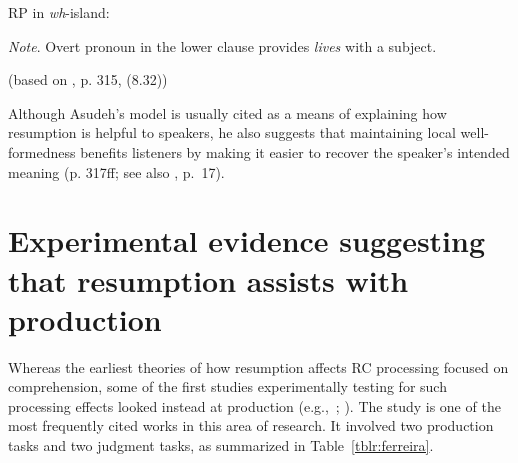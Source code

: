 \a RP in \textit{wh}-island:\par\nobreak
{}\par\nobreak
\textit{Note}. Overt pronoun in the lower clause provides \textit{lives} with a subject.\par\nobreak\vspace{5pt}
\hfill (based on \cite{asudeh2004}, p. 315, (8.32))\label{ex-asudeh-c}
\xe 

\noindent Although Asudeh's model is usually cited as a means of explaining how resumption is helpful to speakers, he also suggests that maintaining local well-formedness benefits listeners by making it easier to recover the speaker's intended meaning (p. 317ff; see also \cite{beltrama.xiang2016}, p.~17).

\section{Experimental evidence suggesting that resumption assists with production}\label{res-evidence-production}

Whereas the earliest theories of how resumption affects RC processing focused on comprehension, some of the first studies experimentally testing for such processing effects looked instead at production (e.g.,~\cite{ferreira.swets2005}; \cite{zukowski.larsen2004}). The \textcite{ferreira.swets2005} study is one of the most frequently cited works in this area of research. It involved two production tasks and two judgment tasks, as summarized in Table~\ref{tblr:ferreira}.

